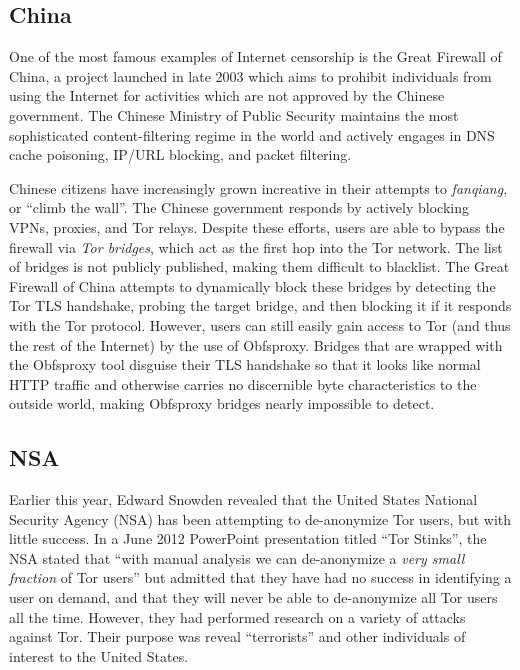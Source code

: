 \documentclass[journal]{IEEEtran}
\begin{document}
\subsection{China}

One of the most famous examples of Internet censorship is the Great Firewall of China, a project launched in late 2003 which aims to prohibit individuals from using the Internet for activities which are not approved by the Chinese government. The Chinese Ministry of Public Security maintains the most sophisticated content-filtering regime in the world and actively engages in DNS cache poisoning, IP/URL blocking, and packet filtering.

Chinese citizens have increasingly grown increative in their attempts to \textit{fanqiang}, or ``climb the wall''. The Chinese government responds by actively blocking VPNs, proxies, and Tor relays. Despite these efforts, users are able to bypass the firewall via \textit{Tor bridges}, which act as the first hop into the Tor network. The list of bridges is not publicly published, making them difficult to blacklist. The Great Firewall of China attempts to dynamically block these bridges by detecting the Tor TLS handshake, probing the target bridge, and then blocking it if it responds with the Tor protocol. However, users can still easily gain access to Tor (and thus the rest of the Internet) by the use of Obfsproxy. Bridges that are wrapped with the Obfsproxy tool disguise their TLS handshake so that it looks like normal HTTP traffic and otherwise carries no discernible byte characteristics to the outside world, making Obfsproxy bridges nearly impossible to detect.\cite{Anderson2013}

\subsection{NSA}

Earlier this year, Edward Snowden revealed that the United States National Security Agency (NSA) has been attempting to de-anonymize Tor users, but with little success. In a June 2012 PowerPoint presentation titled ``Tor Stinks'', the NSA stated that ``with manual analysis we can de-anonymize a \textit{very small fraction} of Tor users'' but admitted that they have had no success in identifying a user on demand, and that they will never be able to de-anonymize all Tor users all the time. However, they had performed research on a variety of attacks against Tor. Their purpose was reveal ``terrorists'' and other individuals of interest to the United States.
\end{document}
